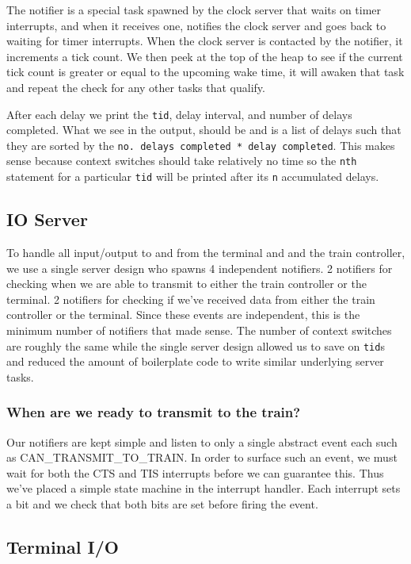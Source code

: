 \documentclass[letterpaper]{article}
\begin{document}
The notifier is a special task spawned by the clock server that waits on timer interrupts, and when it receives one, notifies the clock server and goes back to waiting for timer interrupts. When the clock server is contacted by the notifier, it increments a tick count. We then peek at the top of the heap to see if the current tick count is greater or equal to the upcoming wake time, it will awaken that task and repeat the check for any other tasks that qualify.

After each delay we print the \verb!tid!, delay interval, and number of delays completed. What we see in the output, should be and is a list of delays such that they are sorted by the \verb!no. delays completed * delay completed!. This makes sense because context switches should take relatively no time so the \verb!nth! statement for a particular \verb!tid! will be printed after its \verb!n! accumulated delays.

\subsection{IO Server}

To handle all input/output to and from the terminal and and the train controller, we use a single server design who spawns 4 independent notifiers. 2 notifiers for checking when we are able to transmit to either the train controller or the terminal. 2 notifiers for checking if we've received data from either the train controller or the terminal. Since these events are independent, this is the minimum number of notifiers that made sense. The number of context switches are roughly the same while the single server design allowed us to save on \verb!tid!s and reduced the amount of boilerplate code to write similar underlying server tasks.

\subsubsection{When are we ready to transmit to the train?}

Our notifiers are kept simple and listen to only a single abstract event each such as CAN\_TRANSMIT\_TO\_TRAIN. In order to surface such an event, we must wait for both the CTS and TIS interrupts before we can guarantee this. Thus we've placed a simple state machine in the interrupt handler. Each interrupt sets a bit and we check that both bits are set before firing the event.

\subsection{Terminal I/O}
\end{document}
